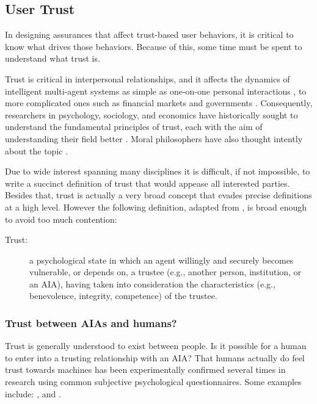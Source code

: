 \subsection{User Trust} \label{sec:trust}
    In designing assurances that affect trust-based user behaviors, it is critical to know what drives those behaviors. Because of this, some time must be spent to understand what trust is. 

    Trust is critical in interpersonal relationships, and it affects the dynamics of intelligent multi-agent systems as simple as one-on-one personal interactions  \cite{Lewicki2006-hj}, to more complicated ones such as financial markets and governments \cite{Fukuyama1995-un}. Consequently, researchers in psychology, sociology, and economics have historically sought to understand the fundamental principles of trust, each with the aim of understanding their field better \cite{Gambetta1988-pi}. Moral philosophers have also thought intently about the topic \cite{Baier1986-im}.

    Due to wide interest spanning many disciplines it is difficult, if not impossible, to write a succinct definition of trust that would appease all interested parties. Besides that, trust is actually a very broad concept that evades precise definitions at a high level. However the following definition, adapted from \cite{McKnight2004-vv}, is broad enough to avoid too much contention:

    \begin{description}
        \item [Trust:] a psychological state in which an agent willingly and securely becomes vulnerable, or depends on, a trustee (e.g., another person, institution, or an AIA), having taken into consideration the characteristics (e.g., benevolence, integrity, competence) of the trustee.
    \end{description}

    \subsubsection{Trust between AIAs and humans?}
        Trust is generally understood to exist between people. Is it possible for a human to enter into a trusting relationship with an AIA? That humans actually do feel trust towards machines has been experimentally confirmed several times in research using common subjective psychological questionnaires. Some examples include: \citet{Muir1996-gt,Reeves1997-ad,Groom2007-bz,Mcknight2011-gv,Riley1996-qm,Bainbridge2011-pl,Kaniarasu2012-mo,Salem2015-md,Desai2012-rc, Freedy2007-sg, Inagaki1998-cl, Kaniarasu2013-ho}, and \citet{Wang2016-id}.


